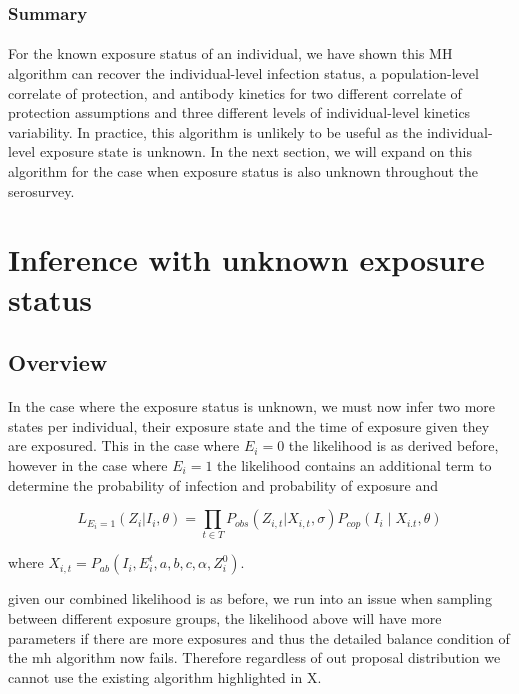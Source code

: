 \documentclass{article}
\begin{document}
\subsubsection{Summary}
\paragraph{}For the known exposure status of an individual, we have shown this MH algorithm can recover the individual-level infection status, a population-level correlate of protection, and antibody kinetics for two different correlate of protection assumptions and three different levels of individual-level kinetics variability. In practice, this algorithm is unlikely to be useful as the individual-level exposure state is unknown. In the next section, we will expand on this algorithm for the case when exposure status is also unknown throughout the serosurvey. 




\newpage
\section{Inference with unknown exposure status}

\subsection{Overview}

\paragraph{}In the case where the exposure status is unknown, we must now infer two more states per individual, their exposure state and the time of exposure given they are exposured. This in the case where $E_i = 0$ the likelihood is as derived before, however in the case where $E_i = 1$ the likelihood contains an additional term to determine the probability of infection and probability of exposure and 


\begin{equation}
L_{E_i = 1}(Z_{i}| I_i, \theta) = \prod_{t \in T}P_{obs}(Z_{i,t}|X_{i,t}, \sigma)P_{cop}(I_i \mid  X_{i.t}, \theta)
\end{equation}

where $X_{i,t} =P_{ab}( I_i,  E_i^t, a, b, c, \alpha, Z^0_i) $.

given our combined likelihood is as before, we run into an issue when sampling between different exposure groups, the likelihood above will have more parameters if there are more exposures and thus the detailed balance condition of the mh algorithm now fails. Therefore regardless of out proposal distribution we cannot use the existing algorithm highlighted in X. 
\end{document}

